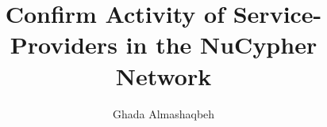 \documentclass{llncs}
\begin{document}
\title{\Large \bf Confirm Activity of Service-Providers in the NuCypher Network}
\author{Ghada Almashaqbeh}

\date{} %



\maketitle











\end{document}
